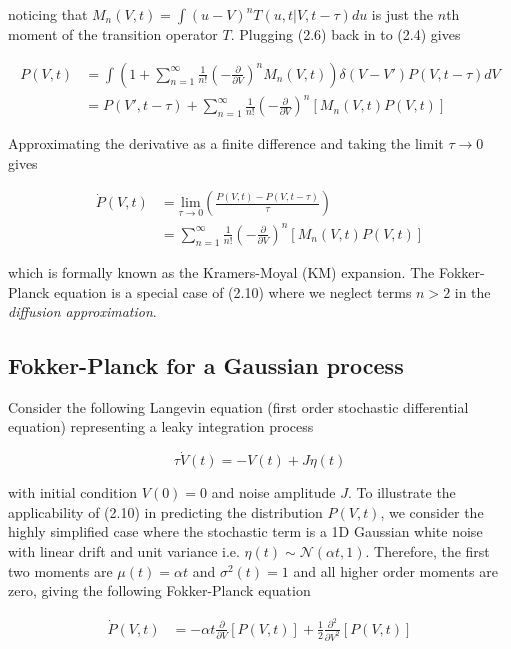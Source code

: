 \documentclass{ucetd}
\begin{document}
noticing that $M_{n}(V,t) = \int(u-V)^{n}T(u, t | V, t-\tau)du$ is just the $n$th moment of the transition operator $T$. Plugging (2.6) back in to (2.4) gives 

\begin{align}
P(V, t) &= \int \left(1 + \sum_{n=1}^{\infty} \frac{1}{n!}\left(-\frac{\partial}{\partial V}\right)^{n} M_{n}(V,t)\right)\delta(V-V')P(V, t-\tau)dV\\
&= P(V', t-\tau) + \sum_{n=1}^{\infty} \frac{1}{n!}\left(-\frac{\partial}{\partial V}\right)^{n} \left[M_{n}(V,t)P(V,t)\right]
\end{align} 

Approximating the derivative as a finite difference and taking the limit $\tau\rightarrow 0$ gives

\begin{align}
\dot{P}(V,t)  &= \underset{\tau\rightarrow 0}{\mathrm{lim}}\left(\frac{P(V, t)-P(V, t-\tau)}{\tau}\right)\\
&= \sum_{n=1}^{\infty} \frac{1}{n!}\left(-\frac{\partial}{\partial V}\right)^{n} \left[M_{n}(V,t)P(V,t)\right]
\end{align} 

which is formally known as the Kramers-Moyal (KM) expansion. The Fokker-Planck equation is a special case of (2.10) where we neglect terms $n>2$ in the \emph{diffusion approximation}.

\subsection{Fokker-Planck for a Gaussian process}

Consider the following Langevin equation (first order stochastic differential equation) representing a leaky integration process

\begin{equation*}
\tau \dot{V}(t) = -V(t) + J\eta(t)
\end{equation*}

with initial condition $V(0) = 0$ and noise amplitude $J$. To illustrate the applicability of (2.10) in predicting the distribution $P(V,t)$, we consider the highly simplified case where the stochastic term is a 1D Gaussian white noise with linear drift and unit variance i.e. $\eta(t) \sim \mathcal{N}(\alpha t,1)$. Therefore, the first two moments are $\mu(t) = \alpha t$ and $\sigma^{2}(t) = 1$ and all higher order moments are zero, giving the following Fokker-Planck equation

\begin{align*}
\dot{P}(V,t) &= -\alpha t\frac{\partial}{\partial V}[P(V,t)] + \frac{1}{2}\frac{\partial^{2}}{\partial V^{2}}[P(V,t)]\\
\end{align*}
\end{document}
